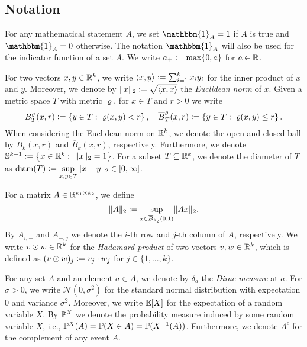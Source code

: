 \subsection{Notation}

For any mathematical statement $A$, we set $\mathbbm{1}_A =1$ if $A$ is true and $\mathbbm{1}_A = 0$ otherwise.
The notation $\mathbbm{1}_A$ will also be used for the indicator function of a set $A$. 
We write $a_+ \mathrel{\mathop:}= \max \{0,a\}$ for $a \in \mathbb{R}$.

For two vectors $x,y \in \mathbb{R}^k$, we write $\langle x,y \rangle \mathrel{\mathop:}= \sum_{i=1}^k x_iy_i$
for the inner product of $x$ and $y$.
Moreover, we denote by $\Vert x \Vert_2 \mathrel{\mathop:}= \sqrt{\langle x, x \rangle}$ the \emph{Euclidean norm} of $x$. 
Given a metric space $T$ with metric $\varrho$, for $x \in T$ and $r>0$ we write
\begin{equation*}
  B^\varrho_{T} (x,r)
  \mathrel{\mathop:}= \left\{ y \in T : \ \varrho(x,y) < r\right\},
  \quad
  \overline{B}^\varrho_{T} (x,r)
  \mathrel{\mathop:}= \left\{ y \in T : \ \varrho(x,y) \leq r\right\}.
\end{equation*}
When considering the Euclidean norm on $\mathbb{R}^k$, we denote the open and closed ball by $B_k(x,r)$
and $\overline{B}_k(x,r)$, respectively.
Furthermore, we denote $\mathbb{S}^{k-1} \defeq \left\{ x \in \RR^k: \ \Vert x \Vert_2 = 1\right\}$.
For a subset $T \subseteq \mathbb{R}^k$, we denote the diameter of $T$ as
$\operatorname{diam}(T) \mathrel{\mathop:}= \underset{x,y \in T}{\sup} \Vert x - y \Vert_2 \in [0, \infty]$. 

For a matrix $A \in \mathbb{R}^{k_1 \times k_2}$, we define 
\begin{equation*}
  \Vert A \Vert_2 \mathrel{\mathop:}= \underset{ x \in \overline{B}_{k_2}(0,1)}{\sup} \Vert Ax \Vert_2.
\end{equation*}
 By $A_{i,-}$ and $A_{-,j}$ we denote the $i$-th row and $j$-th column of $A$, respectively.
 We write $v \odot w \in \mathbb{R}^k$ for the \emph{Hadamard product} of two vectors $v, w \in \mathbb{R}^k$,
 which is defined as $(v \odot w)_j \mathrel{\mathop:}= v_j \cdot w_j $ for $j \in \{1,...,k\}$.

For any set $A$ and an element $a \in A$, we denote by $\delta_a$ the \emph{Dirac-measure} at $a$.
For $\sigma > 0$, we write $\mathcal{N}(0, \sigma^2)$ for the standard normal distribution
with expectation $0$ and variance $\sigma^2$. 
Moreover, we write $\mathbb{E}[X]$ for the expectation of a random variable $X$.
By $\mathbb{P}^X$ we denote the probability measure induced by some random variable $X$,
i.e., $\mathbb{P}^X(A) = \mathbb{P}(X \in A) = \mathbb{P} (X^{-1}(A))$. Furthermore, we denote $A^c$ for the complement of any event $A$.

